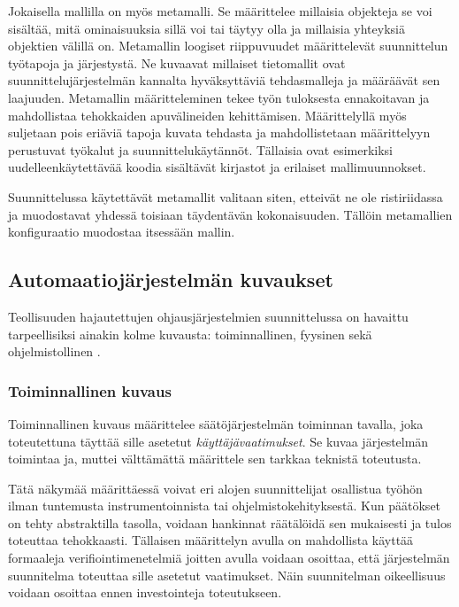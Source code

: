 \documentclass[finnish,12pt]{article}
\begin{document}
Jokaisella mallilla on myös metamalli. Se määrittelee millaisia objekteja se voi sisältää, mitä ominaisuuksia sillä voi tai täytyy olla ja millaisia yhteyksiä objektien välillä on.
Metamallin loogiset riippuvuudet määrittelevät suunnittelun työtapoja ja järjestystä.
Ne kuvaavat millaiset tietomallit ovat suunnittelujärjestelmän kannalta hyväksyttäviä tehdasmalleja ja
määräävät sen laajuuden. Metamallin määritteleminen tekee työn tuloksesta ennakoitavan ja mahdollistaa tehokkaiden apuvälineiden kehittämisen.
Määrittelyllä myös suljetaan pois eriäviä tapoja kuvata tehdasta ja mahdollistetaan määrittelyyn perustuvat työkalut ja suunnittelukäytännöt.
Tällaisia ovat esimerkiksi uudelleenkäytettävää koodia sisältävät kirjastot ja erilaiset mallimuunnokset.

Suunnittelussa käytettävät metamallit valitaan siten, etteivät ne ole ristiriidassa ja muodostavat yhdessä toisiaan täydentävän kokonaisuuden.
Tällöin metamallien konfiguraatio muodostaa itsessään mallin.


	\subsection{Automaatiojärjestelmän kuvaukset}

Teollisuuden hajautettujen ohjausjärjestelmien suunnittelussa on havaittu
tarpeellisiksi ainakin kolme kuvausta: toiminnallinen, fyysinen sekä ohjelmistollinen \cite{RefWorks:38}.

		\subsubsection{Toiminnallinen kuvaus}

Toiminnallinen kuvaus määrittelee säätöjärjestelmän toiminnan tavalla, joka toteutettuna täyttää sille asetetut \emph{käyttäjävaatimukset}.
Se kuvaa järjestelmän toimintaa ja, muttei välttämättä määrittele sen tarkkaa teknistä toteutusta. \cite{RefWorks:60}

Tätä näkymää määrittäessä voivat eri alojen suunnittelijat osallistua työhön ilman
tuntemusta instrumentoinnista tai ohjelmistokehityksestä. Kun päätökset on tehty
abstraktilla tasolla, voidaan hankinnat räätälöidä sen mukaisesti ja tulos
toteuttaa tehokkaasti.
Tällaisen määrittelyn avulla on mahdollista käyttää formaaleja verifiointimenetelmiä joitten avulla
voidaan osoittaa, että järjestelmän suunnitelma toteuttaa sille asetetut vaatimukset.
Näin suunnitelman oikeellisuus voidaan osoittaa ennen investointeja toteutukseen. \cite{RefWorks:41}
\end{document}
